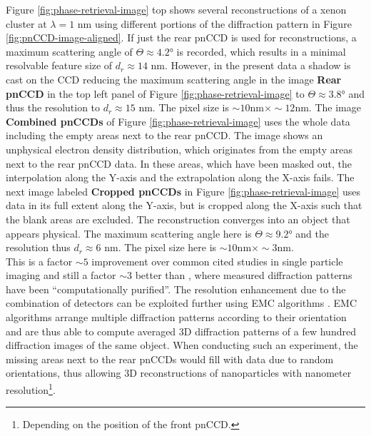 Figure \ref{fig:phase-retrieval-image} top shows several reconstructions of a xenon cluster at $\lambda = 1$ nm using different portions of the diffraction pattern in Figure \ref{fig:pnCCD-image-aligned}. If just the rear pnCCD is used for reconstructions, a maximum scattering angle of $\Theta\approx 4.2$° is recorded, which results in a minimal resolvable feature size of $d_{r}\approx 14$ nm. However, in the present data a shadow is cast on the CCD reducing the maximum scattering angle in the image \textbf{Rear pnCCD} in the top left panel of Figure \ref{fig:phase-retrieval-image} to $\Theta\approx 3.8$° and thus the resolution to $d_{r}\approx 15$ nm. The pixel size is $\sim 10 \text{nm} \times \sim 12 \text{nm}$. The image \textbf{Combined pnCCDs} of Figure \ref{fig:phase-retrieval-image} uses the whole data including the empty areas next to the rear pnCCD. The image shows an unphysical electron density distribution, which originates from the empty areas next to the rear pnCCD data. In these areas, which have been masked out, the interpolation along the Y-axis and the extrapolation along the X-axis fails. The next image labeled \textbf{Cropped pnCCDs} in Figure \ref{fig:phase-retrieval-image} uses data in its full extent along the Y-axis, but is cropped along the X-axis such that the blank areas are excluded. The reconstruction converges into an object that appears physical. The maximum scattering angle here is $\Theta \approx 9.2$° and the resolution thus $d_{r}\approx 6$ nm. The pixel size here is $\sim 10 \text{nm} \times \sim 3 \text{nm}$.\\[1\baselineskip]
%
This is a factor $\sim 5$ improvement over common cited studies in single particle imaging \citep{Seibert-2011-Nature} and still a factor $\sim 3$ better than \citep{Hantke-2014-NatPho}, where measured diffraction patterns have been ``computationally purified''. The resolution enhancement due to the combination of detectors can be exploited further using EMC algorithms \citep{Loh-2009-PRE}. EMC algorithms arrange multiple diffraction patterns according to their orientation and are thus able to compute averaged 3D diffraction patterns of a few hundred diffraction images of the same object. When conducting such an experiment, the missing areas next to the rear pnCCDs would fill with data due to random orientations, thus allowing 3D reconstructions of nanoparticles with nanometer resolution\footnote{Depending on the position of the front pnCCD.}.\\
%
%
%
